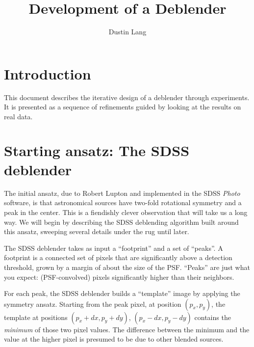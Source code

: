 \documentclass[10pt,letter]{article}
\author{Dustin Lang}
\title{Development of a Deblender}
\begin{document}
\maketitle

\section{Introduction}

This document describes the iterative design of a deblender through
experiments.  It is presented as a sequence of refinements guided by
looking at the results on real data.


%
% 


\section{Starting ansatz: The SDSS deblender}

The initial ansatz, due to Robert Lupton \cite{rhldeblend} and
implemented in the SDSS \emph{Photo} software, is that astronomical
sources have two-fold rotational symmetry and a peak in the center.
This is a fiendishly clever observation that will take us a long way.
We will begin by describing the SDSS deblending algorithm built around
this ansatz, sweeping several details under the rug until later.

The SDSS deblender takes as input a ``footprint'' and a set of
``peaks''.  A footprint is a connected set of pixels that are
significantly above a detection threshold, grown by a margin of about
the size of the PSF.  ``Peaks'' are just what you expect:
(PSF-convolved) pixels significantly higher than their neighbors.

For each peak, the SDSS deblender builds a ``template'' image by
applying the symmetry ansatz.  Starting from the peak pixel, at
position $(p_x,p_y)$, the template at positions $(p_x + dx, p_y +
dy)$, $(p_x - dx, p_y - dy)$ contains the \emph{minimum} of those two
pixel values.  The difference between the minimum and the value at the
higher pixel is presumed to be due to other blended sources.
\end{document}
